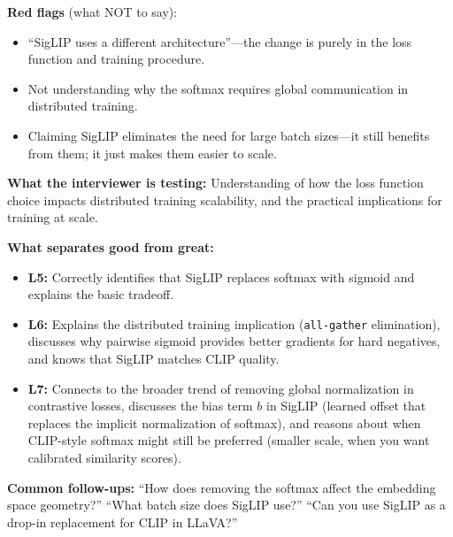 \begin{interviewq}
\textbf{Red flags} (what NOT to say):
\begin{itemize}
    \item ``SigLIP uses a different architecture''---the change is purely in the loss function and training procedure.
    \item Not understanding why the softmax requires global communication in distributed training.
    \item Claiming SigLIP eliminates the need for large batch sizes---it still benefits from them; it just makes them easier to scale.
\end{itemize}

\textbf{What the interviewer is testing:} Understanding of how the loss function choice impacts distributed training scalability, and the practical implications for training at scale.

\textbf{What separates good from great:}
\begin{itemize}
    \item \textbf{L5:} Correctly identifies that SigLIP replaces softmax with sigmoid and explains the basic tradeoff.
    \item \textbf{L6:} Explains the distributed training implication (\texttt{all-gather} elimination), discusses why pairwise sigmoid provides better gradients for hard negatives, and knows that SigLIP matches CLIP quality.
    \item \textbf{L7:} Connects to the broader trend of removing global normalization in contrastive losses, discusses the bias term $b$ in SigLIP (learned offset that replaces the implicit normalization of softmax), and reasons about when CLIP-style softmax might still be preferred (smaller scale, when you want calibrated similarity scores).
\end{itemize}

\textbf{Common follow-ups:} ``How does removing the softmax affect the embedding space geometry?'' ``What batch size does SigLIP use?'' ``Can you use SigLIP as a drop-in replacement for CLIP in LLaVA?''
\end{interviewq}


